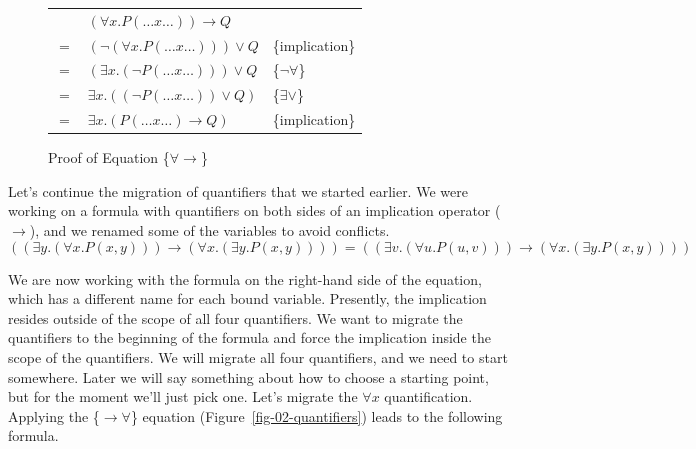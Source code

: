 {{\begin{figure}
\begin{center}
\begin{tabular}{cll}
   & $(\forall x.P(\dots x \dots)) \rightarrow Q$ & \\
$=$&  $(\neg(\forall x.P(\dots x \dots))) \vee Q$ & \{implication\}\\
$=$& $(\exists x.(\neg P(\dots x \dots))) \vee Q$ & \{$\neg\forall$\}\\
$=$&  $\exists x.((\neg P(\dots x \dots)) \vee Q)$& \{$\exists\vee$\}\\
$=$&  $\exists x.(P(\dots x \dots) \rightarrow Q)$& \{implication\}\\
\end{tabular}
\end{center}
\caption{Proof of Equation \{${\forall}{\rightarrow}$\}}
\label{fig:quantifier-negation}
\end{figure}


Let's continue the migration of quantifiers that
we started earlier.
We were working on a formula with quantifiers on both sides
of an implication operator ($\rightarrow$), and
we renamed some of the variables to avoid conflicts.
$$((\exists y.(\forall x.P(x, y))) \rightarrow (\forall x.(\exists y.P(x, y)))) =
((\exists v.(\forall u.P(u, v))) \rightarrow (\forall x.(\exists y.P(x, y))))$$

We are now working with the formula on the right-hand side of the equation,
which has a different name for each bound variable.
Presently, the implication resides
outside of the scope of all four quantifiers.
We want to migrate the quantifiers to the beginning of the formula
and force the implication inside the scope of the quantifiers.
We will migrate all four quantifiers, and we need to start somewhere.
Later we will say something about how to choose a starting point,
but for the moment we'll just pick one.
Let's migrate the $\forall x$ quantification.
Applying the \{${\rightarrow}{\forall}$\} equation (Figure~\ref{fig-02-quantifiers})
leads to the following formula.

}}
